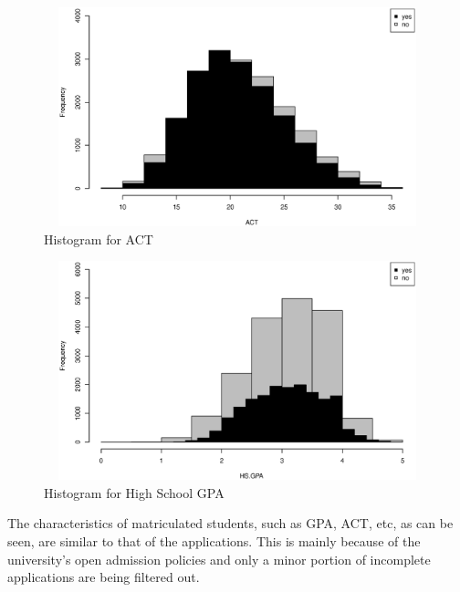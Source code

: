 \documentclass[12pt,english]{report}
\begin{document}
\begin{figure} [H]
\includegraphics[width=6in, height=2.5in] {pic/enroll_act} %
\caption{Histogram for ACT} \label{enroll_act}
\end{figure}

\begin{figure} [H]
\includegraphics[width=6in, height=2.5in]{pic/enroll_gpa}
\caption{Histogram for High School GPA  } \label{enroll_gpa}
\end{figure}


The characteristics of matriculated students, such as GPA, ACT, etc, as can be seen, are similar to that of the applications.  This is mainly because of the  university's open admission policies and only a minor portion of incomplete applications are being filtered out.  


\end{document}

